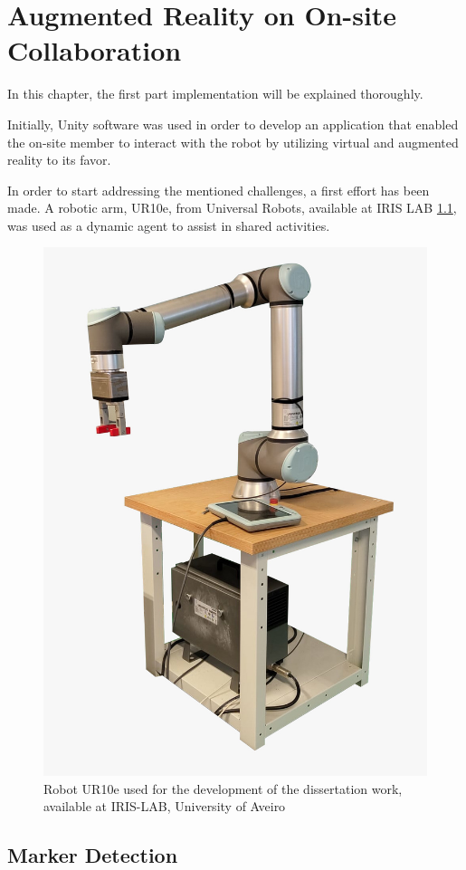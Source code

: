 \chapter{Augmented Reality on On-site Collaboration}%
\label{chapter:on-site}


\begin{introduction}
In this chapter, the first part implementation will be explained thoroughly. 
\end{introduction}

Initially, Unity software was used in order to develop an application that enabled the on-site member to interact with the robot by utilizing 
virtual and augmented reality to its favor.  


In order to start addressing the mentioned challenges, a first effort has been made. A robotic arm, UR10e, from Universal Robots, 
available at IRIS LAB \ref{f:ur10e_iris}, was used as a dynamic agent to assist in shared activities.

\begin{figure}[h]
    \centering
    \includegraphics[width=0.4\linewidth]{figs/ur10e.jpeg}
    \caption{Robot UR10e used for the development of the dissertation work, available at IRIS-LAB, University of Aveiro}
    \label{f:ur10e_iris}
\end{figure}

\section{Marker Detection}
\label{section:marker-detection}


